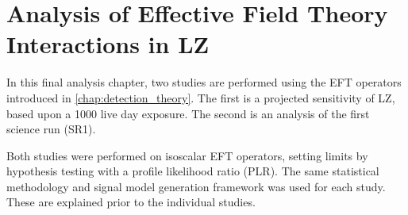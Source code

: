 \chapter{Analysis of Effective Field Theory Interactions in LZ}
\label{chap:analysis_eft_work}
In this final analysis chapter, two studies are performed using the EFT operators introduced in \autoref{chap:detection_theory}.
The first is a projected sensitivity of LZ, based upon a 1000 live day exposure.
The second is an analysis of the first science run (SR1).
\par
Both studies were performed on isoscalar EFT operators, setting limits by hypothesis testing with a profile likelihood ratio (PLR).
The same statistical methodology and signal model generation framework was used for each study.
These are explained prior to the individual studies.



%









%

%

